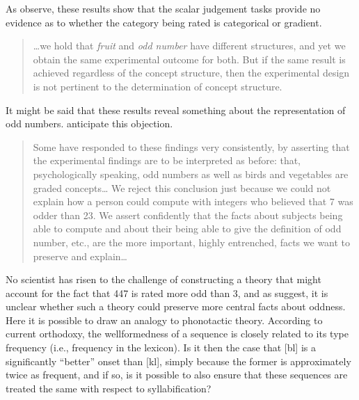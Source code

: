 As \citeauthor{Armstrong1983} observe, these results show that the scalar judgement tasks provide no evidence as to whether the category being rated is categorical or gradient.

\begin{quote}
\ldots{}we hold that \emph{fruit} and \emph{odd number} have different structures, and yet we obtain the same experimental outcome for both. But if the same result is achieved regardless of the concept structure, then the experimental design is not pertinent to the determination of concept structure. \citep[284--5]{Armstrong1983}
\end{quote}

It might be said that these results reveal something about the representation of odd numbers.
\citeauthor{Armstrong1983} anticipate this objection.

\begin{quote}
Some have responded to these findings very consistently, by asserting that the experimental findings are to be interpreted as before: that, psychologically speaking, odd numbers as well as birds and vegetables are graded concepts\ldots{} We reject this conclusion just because we could not explain how a person could compute with integers who believed that 7 was odder than 23. We assert confidently that the facts about subjects being able to compute and about their being able to give the definition of odd number, etc., are the more important, highly entrenched, facts we want to preserve and explain\ldots{} \citep[284]{Armstrong1983}
\end{quote}

No scientist has risen to the challenge of constructing a theory that might account for the fact that 447 is rated more odd than 3, and as \citeauthor{Armstrong1983} suggest, it is unclear whether such a theory could preserve more central facts about oddness.
Here it is possible to draw an analogy to phonotactic theory.
According to current orthodoxy, the wellformedness of a sequence is closely related to its type frequency (i.e., frequency in the lexicon).
Is it then the case that [bl] is a significantly ``better'' onset than [kl], simply because the former is approximately twice as frequent, and if so, is it possible to also ensure that these sequences are treated the same with respect to syllabification?

